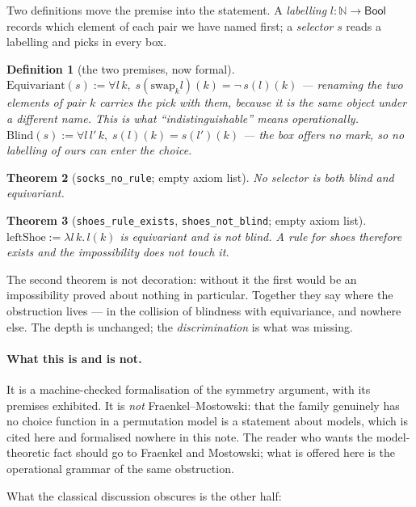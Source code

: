 \documentclass[11pt]{article}
\newtheorem{thm}{Theorem}[section]
\newtheorem{defn}[thm]{Definition}
\theoremstyle{remark}
\newcommand{\N}{\mathbb{N}}
\begin{document}
Two definitions move the premise into the statement.  A
\emph{labelling} $l : \N \to \mathsf{Bool}$ records which element of each
pair we have named first; a \emph{selector} $s$ reads a labelling and
picks in every box.

\begin{defn}[the two premises, now formal]
$\mathrm{Equivariant}(s) := \forall l\,k,\; s(\mathrm{swap}_k l)(k) =
\lnot\, s(l)(k)$ --- renaming the two elements of pair $k$ carries the
pick with them, because it is the same object under a different name.
This is what ``indistinguishable'' means operationally.\\
$\mathrm{Blind}(s) := \forall l\,l'\,k,\; s(l)(k) = s(l')(k)$ --- the box
offers no mark, so no labelling of ours can enter the choice.
\end{defn}

\begin{thm}[\texttt{socks\_no\_rule}; empty axiom list]
No selector is both blind and equivariant.
\end{thm}

\begin{thm}[\texttt{shoes\_rule\_exists}, \texttt{shoes\_not\_blind};
empty axiom list]
$\mathrm{leftShoe} := \lambda l\,k.\, l(k)$ is equivariant and is not
blind.  A rule for shoes therefore exists and the impossibility does not
touch it.
\end{thm}

The second theorem is not decoration: without it the first would be an
impossibility proved about nothing in particular.  Together they say
where the obstruction lives --- in the collision of blindness with
equivariance, and nowhere else.  The depth is unchanged; the
\emph{discrimination} is what was missing.

\paragraph{What this is and is not.}  It is a machine-checked
formalisation of the symmetry argument, with its premises exhibited.  It
is \emph{not} Fraenkel--Mostowski: that the family genuinely has no
choice function in a permutation model is a statement about models,
which is cited here and formalised nowhere in this note.  The reader who
wants the model-theoretic fact should go to Fraenkel and Mostowski; what
is offered here is the operational grammar of the same obstruction.

What the classical discussion obscures is the other half:
\end{document}
